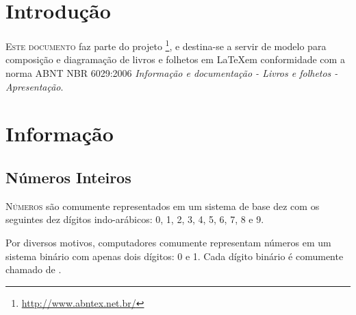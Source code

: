 \documentclass[
	12pt,				%
	openright,			%
	twoside,			%
	a4paper,			%
	english,			%
	french,				%
	brazil,				%
	sumario=tradicional
]{abntex2}
\begin{document}


\listoffigures*
\cleardoublepage

\listoftables*
\cleardoublepage

\tableofcontents*
\cleardoublepage

\mainmatter

\chapter*[Introdução]{Introdução}

\lettrine[nindent=0.35em,lhang=0.40,loversize=0.3]{E}{ste documento} faz parte
do projeto \abnTeX\footnote{\url{http://www.abntex.net.br/}}, e destina-se
a servir de modelo para composição e diagramação de livros e folhetos em
\LaTeX em conformidade com a norma ABNT NBR 6029:2006 \emph{Informação e
documentação - Livros e folhetos - Apresentação}.



\chapter{Informação}

\section{Números Inteiros}

\lettrine[nindent=0.35em,lhang=0.40,loversize=0.3]{N}{úmeros}
são comumente representados em um sistema de base dez com os seguintes dez dígitos indo-arábicos: 0, 1, 2, 3, 4, 5, 6, 7, 8 e 9.

Por diversos motivos, computadores comumente representam números em um sistema binário com apenas dois dígitos: 0 e 1. Cada dígito binário é comumente chamado de .
\end{document}
